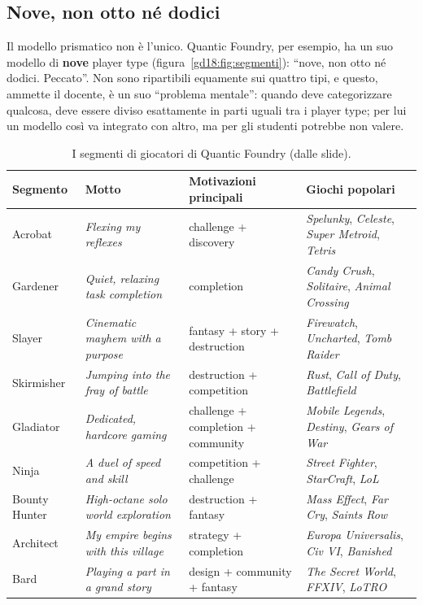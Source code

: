 \subsection{Nove, non otto né dodici}

Il modello prismatico non è l'unico. Quantic Foundry, per esempio, ha un suo modello
di \textbf{nove} player type (figura~\ref{gd18:fig:segmenti}): ``nove, non otto né
dodici. Peccato''. Non sono ripartibili equamente sui quattro tipi, e questo, ammette
il docente, è un suo ``problema mentale'': quando deve categorizzare qualcosa, deve
essere diviso esattamente in parti uguali tra i player type; per lui un modello così
va integrato con altro, ma per gli studenti potrebbe non valere.

\begin{table}[ht]
\centering
\small
\begin{tabular}{@{}p{}p{}p{}p{}@{}}
\toprule
\textbf{Segmento} & \textbf{Motto} & \textbf{Motivazioni principali} &
\textbf{Giochi popolari} \\
\midrule
Acrobat & \emph{Flexing my reflexes} & challenge + discovery & \emph{Spelunky},
\emph{Celeste}, \emph{Super Metroid}, \emph{Tetris} \\
Gardener & \emph{Quiet, relaxing task completion} & completion & \emph{Candy
Crush}, \emph{Solitaire}, \emph{Animal Crossing} \\
Slayer & \emph{Cinematic mayhem with a purpose} & fantasy + story + destruction &
\emph{Firewatch}, \emph{Uncharted}, \emph{Tomb Raider} \\
Skirmisher & \emph{Jumping into the fray of battle} & destruction + competition &
\emph{Rust}, \emph{Call of Duty}, \emph{Battlefield} \\
Gladiator & \emph{Dedicated, hardcore gaming} & challenge + completion + community &
\emph{Mobile Legends}, \emph{Destiny}, \emph{Gears of War} \\
Ninja & \emph{A duel of speed and skill} & competition + challenge & \emph{Street
Fighter}, \emph{StarCraft}, \emph{LoL} \\
Bounty Hunter & \emph{High-octane solo world exploration} & destruction + fantasy &
\emph{Mass Effect}, \emph{Far Cry}, \emph{Saints Row} \\
Architect & \emph{My empire begins with this village} & strategy + completion &
\emph{Europa Universalis}, \emph{Civ VI}, \emph{Banished} \\
Bard & \emph{Playing a part in a grand story} & design + community + fantasy &
\emph{The Secret World}, \emph{FFXIV}, \emph{LoTRO} \\
\bottomrule
\end{tabular}
\caption{I segmenti di giocatori di Quantic Foundry (dalle slide).}
\label{gd18:tab:segmenti}
\end{table}

